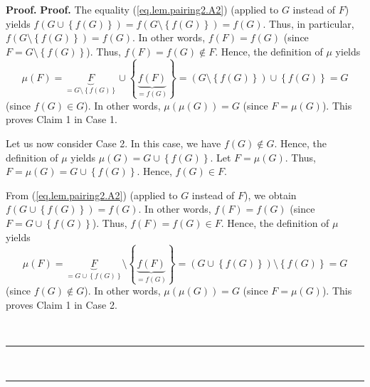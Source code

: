 \documentclass[numbers=enddot,12pt,final,onecolumn,notitlepage]{scrartcl}%
\theoremstyle{definition}
\newenvironment{proof}[1][Proof]{\noindent\textbf{#1.} }{\ \rule{0.5em}{0.5em}}
\newenvironment{verlong}{}{}
\newenvironment{vershort}{}{}
\begin{document}
\begin{proof}
\begin{proof}
\begin{verlong}
The equality (\ref{eq.lem.pairing2.A2}) (applied to $G$ instead of $F$) yields
$f\left(  G\cup\left\{  f\left(  G\right)  \right\}  \right)  =f\left(
G\setminus\left\{  f\left(  G\right)  \right\}  \right)  =f\left(  G\right)
$. Thus, in particular, $f\left(  G\setminus\left\{  f\left(  G\right)
\right\}  \right)  =f\left(  G\right)  $. In other words, $f\left(  F\right)
=f\left(  G\right)  $ (since $F=G\setminus\left\{  f\left(  G\right)
\right\}  $). Thus, $f\left(  F\right)  =f\left(  G\right)  \notin F$. Hence,
the definition of $\mu$ yields
\[
\mu\left(  F\right)  =\underbrace{F}_{=G\setminus\left\{  f\left(  G\right)
\right\}  }\cup\left\{  \underbrace{f\left(  F\right)  }_{=f\left(  G\right)
}\right\}  =\left(  G\setminus\left\{  f\left(  G\right)  \right\}  \right)
\cup\left\{  f\left(  G\right)  \right\}  =G
\]
(since $f\left(  G\right)  \in G$). In other words, $\mu\left(  \mu\left(
G\right)  \right)  =G$ (since $F=\mu\left(  G\right)  $). This proves Claim 1
in Case 1.
\end{verlong}

Let us now consider Case 2. In this case, we have $f\left(  G\right)  \notin
G$. Hence, the definition of $\mu$ yields $\mu\left(  G\right)  =G\cup\left\{
f\left(  G\right)  \right\}  $. Let $F=\mu\left(  G\right)  $. Thus,
$F=\mu\left(  G\right)  =G\cup\left\{  f\left(  G\right)  \right\}  $. Hence,
$f\left(  G\right)  \in F$.

\begin{vershort}
From (\ref{eq.lem.pairing2.A2}) (applied to $G$ instead of $F$), we obtain
$f\left(  G\cup\left\{  f\left(  G\right)  \right\}  \right)  =f\left(
G\right)  $. In other words, $f\left(  F\right)  =f\left(  G\right)  $ (since
$F=G\cup\left\{  f\left(  G\right)  \right\}  $). Thus, $f\left(  F\right)
=f\left(  G\right)  \in F$. Hence, the definition of $\mu$ yields
\[
\mu\left(  F\right)  =\underbrace{F}_{=G\cup\left\{  f\left(  G\right)
\right\}  }\setminus\left\{  \underbrace{f\left(  F\right)  }_{=f\left(
G\right)  }\right\}  =\left(  G\cup\left\{  f\left(  G\right)  \right\}
\right)  \setminus\left\{  f\left(  G\right)  \right\}  =G
\]
(since $f\left(  G\right)  \notin G$). In other words, $\mu\left(  \mu\left(
G\right)  \right)  =G$ (since $F=\mu\left(  G\right)  $). This proves Claim 1
in Case 2.
\end{vershort}


\end{proof}
\end{proof}
\end{document}
